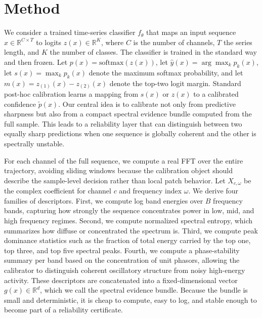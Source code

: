 \documentclass{article}
\begin{document}
\section{Method}
We consider a trained time-series classifier \(f_{\theta}\) that maps an input sequence \(x \in \mathbb{R}^{C \times T}\) to logits \(z(x)\in\mathbb{R}^{K}\), where \(C\) is the number of channels, \(T\) the series length, and \(K\) the number of classes. The classifier is trained in the standard way and then frozen. Let \(p(x)=\mathrm{softmax}(z(x))\), let \(\hat{y}(x)=\arg\max_k p_k(x)\), let \(s(x)=\max_k p_k(x)\) denote the maximum softmax probability, and let \(m(x)=z_{(1)}(x)-z_{(2)}(x)\) denote the top-two logit margin. Standard post-hoc calibration learns a mapping from \(s(x)\) or \(z(x)\) to a calibrated confidence \(\tilde{p}(x)\). Our central idea is to calibrate not only from predictive sharpness but also from a compact spectral evidence bundle computed from the full sample. This leads to a reliability layer that can distinguish between two equally sharp predictions when one sequence is globally coherent and the other is spectrally unstable.

For each channel of the full sequence, we compute a real FFT over the entire trajectory, avoiding sliding windows because the calibration object should describe the sample-level decision rather than local patch behavior. Let \(X_{c,\omega}\) be the complex coefficient for channel \(c\) and frequency index \(\omega\). We derive four families of descriptors. First, we compute log band energies over \(B\) frequency bands, capturing how strongly the sequence concentrates power in low, mid, and high frequency regimes. Second, we compute normalized spectral entropy, which summarizes how diffuse or concentrated the spectrum is. Third, we compute peak dominance statistics such as the fraction of total energy carried by the top one, top three, and top five spectral peaks. Fourth, we compute a phase-stability summary per band based on the concentration of unit phasors, allowing the calibrator to distinguish coherent oscillatory structure from noisy high-energy activity. These descriptors are concatenated into a fixed-dimensional vector \(g(x)\in\mathbb{R}^{d}\), which we call the spectral evidence bundle. Because the bundle is small and deterministic, it is cheap to compute, easy to log, and stable enough to become part of a reliability certificate.
\end{document}

